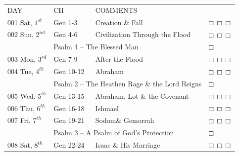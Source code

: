 \documentclass[10pt,landscape,twocolumn,letterpaper]{article}
\begin{document}
\begin{tabular}{p{0.7in}p{0.7in}p{1.8in}p{0.55in}}
  DAY & CH & COMMENTS &  \\
\tiny 001 \normalsize \textcolor[rgb]{0.00,0.00,1.00}{Sat, $1^{st}$} & \textcolor[rgb]{0.00,0.00,1.00}{Gen 1-3} & \textcolor[rgb]{0.50,0.50,0.50}{\footnotesize Creation \& Fall} & $\boxempty$ $\boxempty$ $\boxempty$\\
\tiny 002 \normalsize \textcolor[rgb]{0.00,0.00,1.00}{Sun, $2^{nd}$} & \textcolor[rgb]{0.00,0.00,1.00}{Gen 4-6} & \textcolor[rgb]{0.50,0.50,0.50}{\footnotesize Civilization Through the Flood} & $\boxempty$ $\boxempty$ $\boxempty$\\
     & \multicolumn{2}{l}{\textcolor[rgb]{1.00,0.00,0.00}{Psalm 1 -- The Blessed Man}} & $\boxempty$ \\
\tiny 003 \normalsize \textcolor[rgb]{0.00,0.00,1.00}{Mon, $3^{rd}$} & \textcolor[rgb]{0.00,0.00,1.00}{Gen 7-9} & \textcolor[rgb]{0.50,0.50,0.50}{\footnotesize After the Flood} & $\boxempty$ $\boxempty$ $\boxempty$\\
\tiny 004 \normalsize \textcolor[rgb]{0.00,0.00,1.00}{Tue, $4^{th}$} & \textcolor[rgb]{0.00,0.00,1.00}{Gen 10-12} & \textcolor[rgb]{0.50,0.50,0.50}{\footnotesize Abraham} & $\boxempty$ $\boxempty$ $\boxempty$\\
     & \multicolumn{2}{l}{\textcolor[rgb]{1.00,0.00,0.00}{Psalm 2 -- The Heathen Rage \& the Lord Reigns}} & $\boxempty$ \\
\tiny 005 \normalsize \textcolor[rgb]{0.00,0.00,1.00}{Wed, $5^{th}$} & \textcolor[rgb]{0.00,0.00,1.00}{Gen 13-15} & \textcolor[rgb]{0.50,0.50,0.50}{\footnotesize Abraham, Lot \& the Covenant} & $\boxempty$ $\boxempty$ $\boxempty$\\
\tiny 006 \normalsize \textcolor[rgb]{0.00,0.00,1.00}{Thu, $6^{th}$} & \textcolor[rgb]{0.00,0.00,1.00}{Gen 16-18} & \textcolor[rgb]{0.50,0.50,0.50}{\footnotesize Ishmael}  & $\boxempty$ $\boxempty$ $\boxempty$\\
\tiny 007 \normalsize \textcolor[rgb]{0.00,0.00,1.00}{Fri, $7^{th}$} & \textcolor[rgb]{0.00,0.00,1.00}{Gen 19-21} & \textcolor[rgb]{0.50,0.50,0.50}{\footnotesize Sodom\& Gemorrah} & $\boxempty$ $\boxempty$ $\boxempty$\\
     & \multicolumn{2}{l}{\textcolor[rgb]{1.00,0.00,0.00}{Psalm 3 -- A Psalm of God's Protection}} & $\boxempty$ \\
\tiny 008 \normalsize \textcolor [rgb]{0.00,0.00,1.00}{Sat, $8^{th}$} & \textcolor[rgb]{0.00,0.00,1.00}{Gen 22-24} & \textcolor[rgb]{0.50,0.50,0.50}{\footnotesize Isaac \& His Marriage}  & $\boxempty$ $\boxempty$ $\boxempty$\\

\end{tabular}
\end{document}
